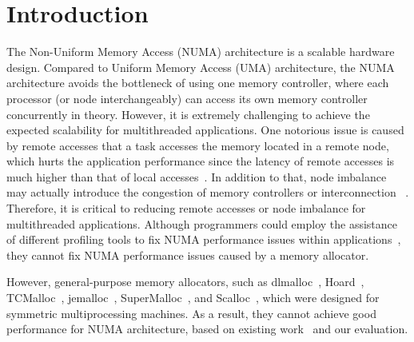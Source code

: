 


\section{Introduction}
\label{sec:intro}

The Non-Uniform Memory Access (NUMA) architecture is a scalable hardware design. Compared to Uniform Memory Access (UMA) architecture, the NUMA architecture avoids the bottleneck of using one memory controller, where each processor (or node interchangeably) can access its own memory controller concurrently in theory. However, it is extremely challenging to achieve the expected scalability for multithreaded applications. One notorious issue is caused by remote accesses that a task accesses the memory located in a remote node, which hurts the application performance since the latency of remote accesses is much higher than that of local accesses~\cite{Blagodurov:2011:CNC:2002181.2002182}. In addition to that, node imbalance may actually introduce the congestion of memory controllers or interconnection ~\cite{Blagodurov:2011:CNC:2002181.2002182}. Therefore, it is critical to reducing remote accesses or node imbalance for multithreaded applications. Although programmers could employ the assistance of different profiling tools to fix NUMA performance issues within applications~\cite{Intel:VTune, Memphis, Lachaize:2012:MMP:2342821.2342826, XuNuma, NumaMMA, 7847070, NumaPerf}, they cannot fix NUMA performance issues caused by a memory allocator.

However, general-purpose memory allocators, such as dlmalloc~\cite{dlmalloc},  Hoard~\cite{Hoard}, TCMalloc~\cite{tcmalloc}, jemalloc~\cite{jemalloc}, SuperMalloc~\cite{supermalloc}, and  Scalloc~\cite{Scalloc}, which were designed for symmetric multiprocessing machines. As a result, they cannot achieve good performance for NUMA architecture, based on existing work~\cite{tcmallocnew, yang2019jarena} and our evaluation. 

